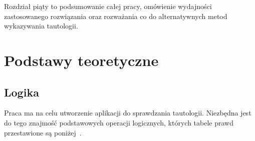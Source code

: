 \documentclass{SGGW-thesis}
\begin{document}
\begin{paragraph}{}
    Rozdział piąty to podsumowanie całej pracy, omówienie wydajności zastosowanego rozwiązania oraz rozważania co do alternatywnych metod wykazywania tautologii. 
\end{paragraph}


\chapter{Podstawy teoretyczne}

\section{Logika}

\begin{paragraph}{}
    Praca ma na celu utworzenie aplikacji do sprawdzania tautologii.  Niezbędna jest do tego znajmość podstawowych operacji logicznych, których tabele prawd przestawione są poniżej~\cite{ross2003discrete}.
\end{paragraph}
\end{document}
